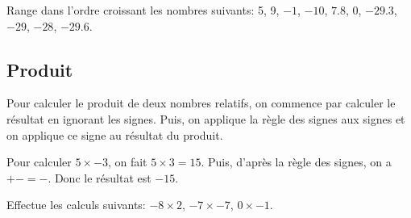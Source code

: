 \begin{exercice}
	Range dans l'ordre croissant les nombres suivants: 5, 9, $-1$, $-10$, $7.8$, 0, $-29.3$, $-29$, $-28$, $-29.6$.
\end{exercice}

\subsection{Produit}

\begin{propriete}
	Pour calculer le produit de deux nombres relatifs, on commence par calculer le résultat en ignorant les signes. Puis, on applique la règle des signes aux signes et on applique ce signe au résultat du produit.
\end{propriete}

\begin{exemple}
	Pour calculer $5 \times -3$, on fait $5 \times 3 = 15$. Puis, d'après la règle des signes, on a $+ - = -$. Donc le résultat est $-15$.
\end{exemple}

\begin{exercice}
	Effectue les calculs suivants: $-8 \times 2$, $-7 \times -7$, $0 \times -1$.
\end{exercice}
